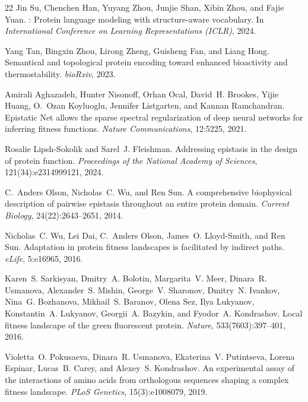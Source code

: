 \documentclass{article}
\begin{document}
\begin{thebibliography}{22}
Jin Su, Chenchen Han, Yuyang Zhou, Junjie Shan, Xibin Zhou, and Fajie Yuan.
: Protein language modeling with structure-aware vocabulary.
\newblock In \emph{International Conference on Learning Representations (ICLR)}, 2024.

Yang Tan, Bingxin Zhou, Lirong Zheng, Guisheng Fan, and Liang Hong.
\newblock Semantical and topological protein encoding toward enhanced bioactivity and thermostability.
\newblock \emph{bioRxiv}, 2023.

Amirali Aghazadeh, Hunter Nisonoff, Orhan Ocal, David~H. Brookes, Yijie Huang, O.~Ozan Koyluoglu, Jennifer Listgarten, and Kannan Ramchandran.
\newblock Epistatic {N}et allows the sparse spectral regularization of deep neural networks for inferring fitness functions.
\newblock \emph{Nature Communications}, 12:5225, 2021.

Rosalie Lipsh-Sokolik and Sarel~J. Fleishman.
\newblock Addressing epistasis in the design of protein function.
\newblock \emph{Proceedings of the National Academy of Sciences}, 121(34):e2314999121, 2024.

C.~Anders Olson, Nicholas~C. Wu, and Ren Sun.
\newblock A comprehensive biophysical description of pairwise epistasis throughout an entire protein domain.
\newblock \emph{Current Biology}, 24(22):2643--2651, 2014.

Nicholas~C. Wu, Lei Dai, C.~Anders Olson, James~O. Lloyd-Smith, and Ren Sun.
\newblock Adaptation in protein fitness landscapes is facilitated by indirect paths.
\newblock \emph{eLife}, 5:e16965, 2016.

Karen~S. Sarkisyan, Dmitry~A. Bolotin, Margarita~V. Meer, Dinara~R. Usmanova, Alexander~S. Mishin, George~V. Sharonov, Dmitry~N. Ivankov, Nina~G. Bozhanova, Mikhail~S. Baranov, Olena Sez, Ilya Lukyanov, Konstantin~A. Lukyanov, Georgii~A. Bazykin, and Fyodor~A. Kondrashov.
\newblock Local fitness landscape of the green fluorescent protein.
\newblock \emph{Nature}, 533(7603):397--401, 2016.

Violetta~O. Pokusaeva, Dinara~R. Usmanova, Ekaterina~V. Putintseva, Lorena Espinar, Lucas~B. Carey, and Alexey~S. Kondrashov.
\newblock An experimental assay of the interactions of amino acids from orthologous sequences shaping a complex fitness landscape.
\newblock \emph{PLoS Genetics}, 15(3):e1008079, 2019.


\end{thebibliography}
\end{document}
